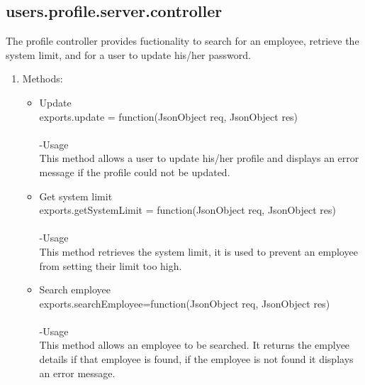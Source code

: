 \documentclass[a4paper,12pt]{article}
\begin{document}
\subsection{users.profile.server.controller}
 The profile controller provides fuctionality to search for an employee, retrieve the system limit, and for a user to update his/her password.
 \begin{enumerate}
 \item Methods:
 	\begin{itemize}
 		\item Update\\ 
 		exports.update = function(JsonObject req, JsonObject res)\\ \\ 
 		-Usage\\
 		This method allows a user to update his/her profile and displays an error message if the profile could not be updated. 
 		\item Get system limit\\ 
 		exports.getSystemLimit = function(JsonObject req, JsonObject res)\\ \\
 		-Usage\\
		 This method retrieves the system limit, it is used to prevent an employee from setting their limit too high.
 		\item Search employee\\
 		exports.searchEmployee=function(JsonObject req, JsonObject res)\\ \\ 
 		-Usage\\
		 This method allows an employee to be searched. It returns the emplyee details if that employee is found, if the employee is not found it displays an error message.
 	\end{itemize}
 \end{enumerate}
\end{document}
